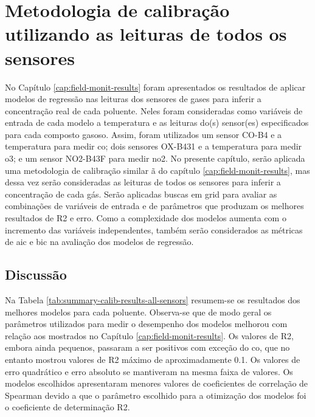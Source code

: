 
\chapter{Metodologia de calibração utilizando as leituras de todos os sensores}\label{cap:calib-methodology}

No Capítulo \ref{cap:field-monit-results} foram apresentados os resultados de aplicar modelos de regressão nas leituras dos sensores de gases para inferir a concentração real de cada poluente. Neles foram consideradas como variáveis de entrada de cada modelo a temperatura e as leituras do(s) sensor(es) especificados para cada composto gasoso. Assim, foram utilizados um sensor CO-B4 e a temperatura para medir \acrshort{co}; dois sensores OX-B431 e a temperatura para medir \acrshort{o3}; e um sensor NO2-B43F para medir \acrshort{no2}. No presente capítulo, serão aplicada uma metodologia de calibração similar ã do capítulo \ref{cap:field-monit-results}, mas dessa vez serão consideradas as leituras de todos os sensores para inferir a concentração de cada gás. Serão aplicadas buscas em grid para avaliar as combinações de variáveis de entrada e de parâmetros que produzam os melhores resultados de R2 e erro. Como a complexidade dos modelos aumenta com o incremento das variáveis independentes, também serão considerados as métricas de \acrshort{aic} e \acrshort{bic} na avaliação dos modelos de regressão.









\section{Discussão}

Na Tabela \ref{tab:summary-calib-results-all-sensors} resumem-se os resultados dos melhores modelos para cada poluente. Observa-se que de modo geral os parâmetros utilizados para medir o desempenho dos modelos melhorou com relação aos mostrados no Capítulo \ref{cap:field-monit-results}. Os valores de R2, embora ainda pequenos, passaram a ser positivos com exceção do \acrshort{co}, que no entanto mostrou valores de R2 máximo de aproximadamente 0.1. Os valores de erro quadrático e erro absoluto se mantiveram na mesma faixa de valores. Os modelos escolhidos apresentaram menores valores de coeficientes de correlação de Spearman devido a que o parâmetro escolhido para a otimização dos modelos foi o coeficiente de determinação R2.

